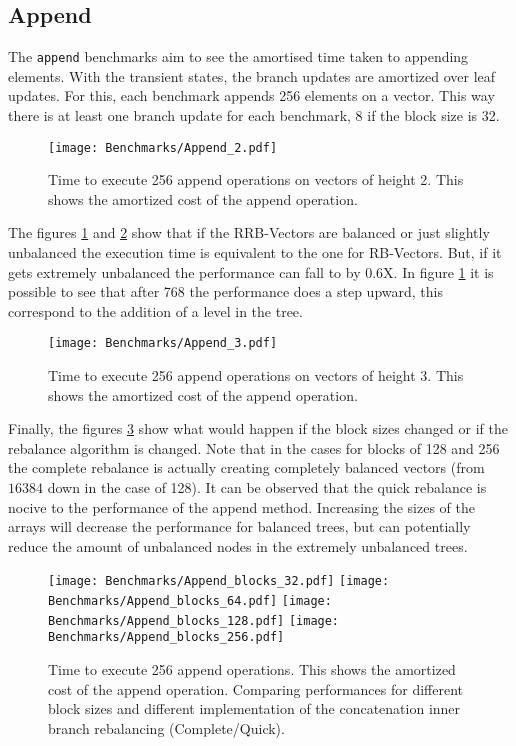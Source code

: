 \subsection{Append}
The \texttt{append} benchmarks aim to see the amortised time taken to appending elements. With the transient states, the branch updates are amortized over leaf updates. For this, each benchmark appends 256 elements on a vector. This way there is at least one branch update for each benchmark, 8 if the block size is 32.

\begin{figure}[h!]
  \centering
  \texttt{[image: Benchmarks/Append\_2.pdf]}
  \caption{Time to execute 256 append operations on vectors of height 2. This shows the amortized cost of the append operation.}
  \label{Append2Benchmarks}
\end{figure}

The figures \ref{Append2Benchmarks} and \ref{Append3Benchmarks} show that if the RRB-Vectors are balanced or just slightly unbalanced the execution time is equivalent to the one for RB-Vectors. But, if it gets extremely unbalanced the performance can fall to by 0.6X. In figure \ref{Append2Benchmarks} it is possible to see that after 768 the performance does a step upward, this correspond to the addition of a level in the tree.

\begin{figure}[h!]
  \centering
  \texttt{[image: Benchmarks/Append\_3.pdf]}
  \caption{Time to execute 256 append operations on vectors of height 3. This shows the amortized cost of the append operation.}
   \label{Append3Benchmarks}
\end{figure}

\FloatBarrier

Finally, the figures \ref{AppendBlocksBenchmarks} show what would happen if the block sizes changed or if the rebalance algorithm is changed. Note that in the cases for blocks of 128 and 256 the complete rebalance is actually creating completely balanced vectors (from $16384$ down in the case of 128). It can be observed that the quick rebalance is nocive to the performance of the append method. Increasing the sizes of the arrays will decrease the performance for balanced trees, but can potentially reduce the amount of unbalanced nodes in the extremely unbalanced trees.

\begin{figure}[h!]
  \centering
  \texttt{[image: Benchmarks/Append\_blocks\_32.pdf]}
  \texttt{[image: Benchmarks/Append\_blocks\_64.pdf]}
  \texttt{[image: Benchmarks/Append\_blocks\_128.pdf]}
  \texttt{[image: Benchmarks/Append\_blocks\_256.pdf]}
  \caption{Time to execute 256 append operations. This shows the amortized cost of the append operation. Comparing performances for different block sizes and different implementation of the concatenation inner branch rebalancing (Complete/Quick).}
  \label{AppendBlocksBenchmarks}
\end{figure}



